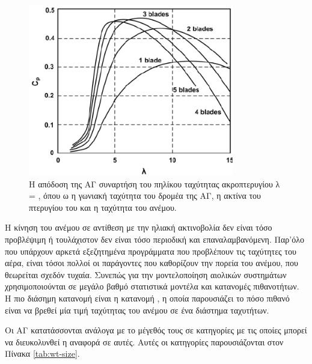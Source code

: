 \documentclass[12pt]{report}
\begin{document}
\begin{figure}[t]
				\center
				\includegraphics[width=0.8\textwidth]{cp}
				\captionsetup{width=0.9\textwidth}
				\caption{Η απόδοση της ΑΓ συναρτήση του πηλίκου ταχύτητας ακροπτερυγίου λ = {}, όπου ω η γωνιακή ταχύτητα του δρομέα της ΑΓ, {} η ακτίνα του πτερυγίου του και 
								{} η ταχύτητα του ανέμου.}
				\label{fig:cp}
\end{figure}

Η κίνηση του ανέμου σε αντίθεση με την ηλιακή ακτινοβολία δεν είναι τόσο προβλέψιμη ή τουλάχιστον δεν είναι τόσο περιοδική και επαναλαμβανόμενη. Παρ'όλο που υπάρχουν αρκετά εξεζητημένα προγράμματα που προβλέπουν τις ταχύτητες 
του αέρα, είναι τόσοι πολλοί οι παράγοντες που καθορίζουν την πορεία του ανέμου, που θεωρείται σχεδόν τυχαία. Συνεπώς για την μοντελοποίηση αιολικών συστημάτων χρησιμοποιούνται σε μεγάλο βαθμό στατιστικά μοντέλα και κατανομές
πιθανοτήτων. Η πιο διάσημη κατανομή είναι η κατανομή {}, η οποία παρουσιάζει το πόσο πιθανό είναι να βρεθεί μία τιμή ταχύτητας του ανέμου σε ένα διάστημα ταχυτήτων.

Οι ΑΓ κατατάσσονται ανάλογα με το μέγεθός τους σε κατηγορίες με τις οποίες μπορεί να διευκολυνθεί η αναφορά σε αυτές. Αυτές οι κατηγορίες παρουσιάζονται στον Πίνακα \ref{tab:wt-size}.
\end{document}
